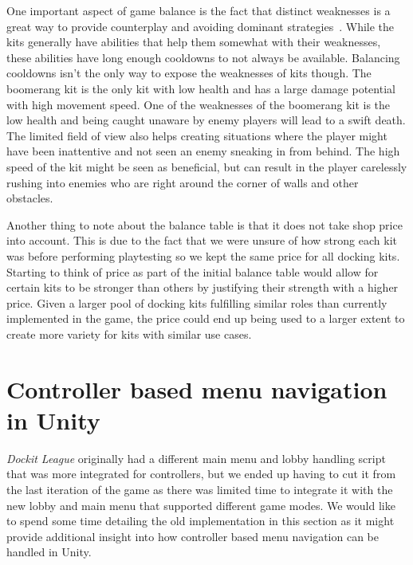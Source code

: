 One important aspect of game balance is the fact that distinct weaknesses is a great way to provide counterplay and avoiding dominant strategies~\cite{gameBalanceWeaknesses}. While the kits generally have abilities that help them somewhat with their weaknesses, these abilities have long enough cooldowns to not always be available. Balancing cooldowns isn't the only way to expose the weaknesses of kits though. 
The boomerang kit is the only kit with low health and has a large damage potential with high movement speed. One of the weaknesses of the boomerang kit is the low health and being caught unaware by enemy players will lead to a swift death. The limited field of view also helps creating situations where the player might have been inattentive and not seen an enemy sneaking in from behind. The high speed of the kit might be seen as beneficial, but can result in the player carelessly rushing into enemies who are right around the corner of walls and other obstacles. 

Another thing to note about the balance table is that it does not take shop price into account. This is due to the fact that we were unsure of how strong each kit was before performing playtesting so we kept the same price for all docking kits. Starting to think of price as part of the initial balance table would allow for certain kits to be stronger than others by justifying their strength with a higher price. Given a larger pool of docking kits fulfilling similar roles than currently implemented in the game, the price could end up being used to a larger extent to create more variety for kits with similar use cases. 
 
\section{Controller based menu navigation in Unity}
\emph{Dockit League} originally had a different main menu and lobby handling script that was more integrated for controllers, but we ended up having to cut it from the last iteration of the game as there was limited time to integrate it with the new lobby and main menu that supported different game modes. We would like to spend some time detailing the old implementation in this section as it might provide additional insight into how controller based menu navigation can be handled in Unity. 

